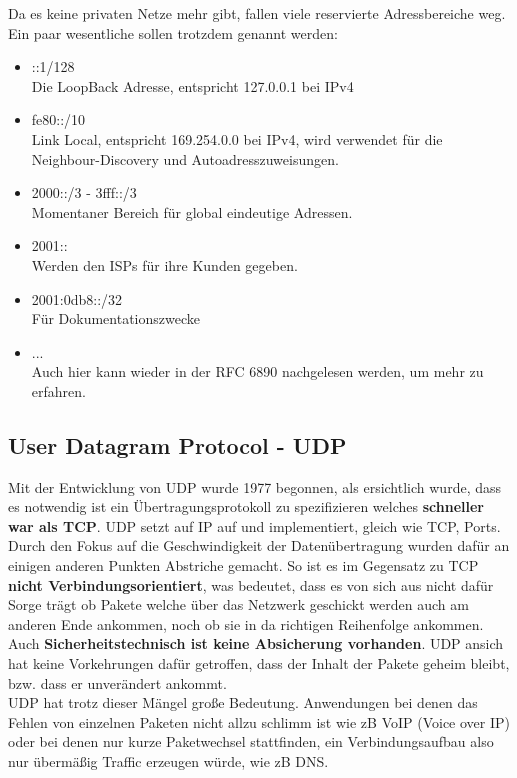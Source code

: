 \documentclass[12pt,a4paper]{report}
\begin{document}
Da es keine privaten Netze mehr gibt, fallen viele reservierte Adressbereiche weg. Ein paar wesentliche sollen trotzdem genannt werden:
\begin{itemize}
\item ::1/128\\
Die LoopBack Adresse, entspricht 127.0.0.1 bei IPv4
\item fe80::/10\\
Link Local, entspricht 169.254.0.0 bei IPv4, wird verwendet für die Neighbour-Discovery und Autoadresszuweisungen.
\item 2000::/3 - 3fff::/3\\
Momentaner Bereich für global eindeutige Adressen.
\item 2001::\\
Werden den ISPs für ihre Kunden gegeben.
\item 2001:0db8::/32\\
Für Dokumentationszwecke
\item ...\\
Auch hier kann wieder in der RFC 6890 nachgelesen werden, um mehr zu erfahren.
\end{itemize}
\subsection{User Datagram Protocol - UDP}
Mit der Entwicklung von UDP wurde 1977 begonnen, als ersichtlich wurde, dass es notwendig ist ein Übertragungsprotokoll zu spezifizieren welches \textbf{schneller war als TCP}. UDP setzt auf IP auf und implementiert, gleich wie TCP, Ports.\\

Durch den Fokus auf die Geschwindigkeit der Datenübertragung wurden dafür an einigen anderen Punkten Abstriche gemacht. So ist es im Gegensatz zu TCP \textbf{nicht Verbindungsorientiert}, was bedeutet, dass es von sich aus nicht dafür Sorge trägt ob Pakete welche über das Netzwerk geschickt werden auch am anderen Ende ankommen, noch ob sie in da richtigen Reihenfolge ankommen.\\
Auch \textbf{Sicherheitstechnisch ist keine Absicherung vorhanden}. UDP ansich hat keine Vorkehrungen dafür getroffen, dass der Inhalt der Pakete geheim bleibt, bzw. dass er unverändert ankommt.\\

UDP hat trotz dieser Mängel große Bedeutung. Anwendungen bei denen das Fehlen von einzelnen Paketen nicht allzu schlimm ist wie zB VoIP (Voice over IP) oder bei denen nur kurze Paketwechsel stattfinden, ein Verbindungsaufbau also nur übermäßig Traffic erzeugen würde, wie zB DNS.\\
\end{document}
